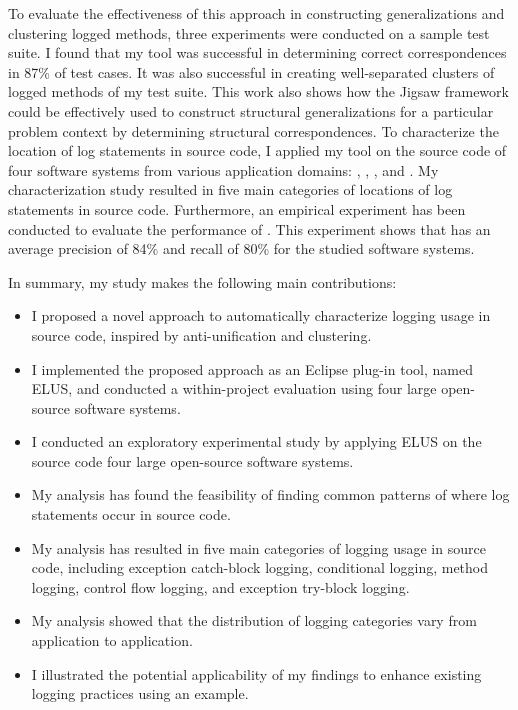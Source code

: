 To evaluate the effectiveness of this approach in constructing generalizations and clustering logged methods, three experiments were conducted on a sample test suite. I found that my tool was successful in determining correct correspondences in 87\% of test cases. It was also successful in creating well-separated clusters of logged methods of my test suite. This work also shows how the Jigsaw framework could be effectively used to construct structural generalizations for a particular problem context by determining structural correspondences. To characterize the location of log statements in source code, I applied my tool on the source code of four software systems from various application domains: , , , and . My characterization study resulted in five main categories of locations of log statements in source code. Furthermore, an empirical experiment has been conducted to evaluate the performance of . This experiment shows that  has an average precision of 84\% and recall of 80\% for the studied software systems.

In summary, my study makes the following main contributions:
\begin{itemize} [leftmargin=.5in]
\item I proposed a novel approach to automatically characterize logging usage in source code, inspired by anti-unification and clustering.
\item I implemented the proposed approach as an Eclipse plug-in tool, named ELUS, and conducted a within-project evaluation using four large open-source software systems.
\item I conducted an exploratory experimental study by applying ELUS on the source code four large open-source software systems.
\item My analysis has found the feasibility of finding common patterns of where log statements occur in source code.
\item My analysis has resulted in five main categories of logging usage in source code, including exception catch-block logging, conditional logging, method logging, control flow logging, and exception try-block logging.
\item My analysis showed that the distribution of logging categories vary from application to application.
\item I illustrated the potential applicability of my findings to enhance existing logging practices using an example. 
\end{itemize}




